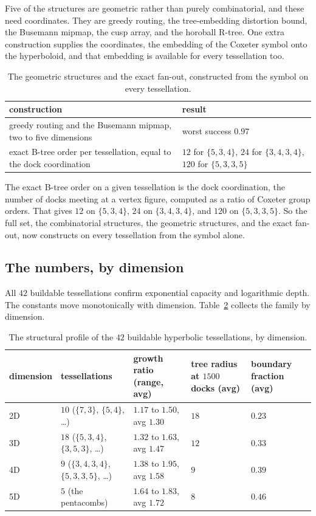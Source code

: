 Five of the structures are geometric rather than purely combinatorial, and these need coordinates. They are greedy routing, the tree-embedding distortion bound, the Busemann mipmap, the cusp array, and the horoball R-tree. One extra construction supplies the coordinates, the embedding of the Coxeter symbol onto the hyperboloid, and that embedding is available for every tessellation too.

\begin{table}[ht]
\centering
\begin{tabular}{@{}ll@{}}
\toprule
construction & result \\
\midrule
greedy routing and the Busemann mipmap, two to five dimensions & worst success $0.97$ \\
exact B-tree order per tessellation, equal to the dock coordination & $12$ for $\{5,3,4\}$, $24$ for $\{3,4,3,4\}$, $120$ for $\{5,3,3,5\}$ \\
\bottomrule
\end{tabular}
\caption{The geometric structures and the exact fan-out, constructed from the symbol on every tessellation.}
\label{tab:geometric-constructions}
\end{table}

The exact B-tree order on a given tessellation is the dock coordination, the number of docks meeting at a vertex figure, computed as a ratio of Coxeter group orders. That gives $12$ on $\{5,3,4\}$, $24$ on $\{3,4,3,4\}$, and $120$ on $\{5,3,3,5\}$. So the full set, the combinatorial structures, the geometric structures, and the exact fan-out, now constructs on every tessellation from the symbol alone.

\subsection{The numbers, by dimension}

All $42$ buildable tessellations confirm exponential capacity and logarithmic depth. The constants move monotonically with dimension. Table~\ref{tab:by-dimension} collects the family by dimension.

\begin{table}[ht]
\centering
\begin{tabular}{@{}lllll@{}}
\toprule
dimension & tessellations & growth ratio (range, avg) & tree radius at $1500$ docks (avg) & boundary fraction (avg) \\
\midrule
2D & $10$ ($\{7,3\}$, $\{5,4\}$, \ldots) & $1.17$ to $1.50$, avg $1.30$ & $18$ & $0.23$ \\
3D & $18$ ($\{5,3,4\}$, $\{3,5,3\}$, \ldots) & $1.32$ to $1.63$, avg $1.47$ & $12$ & $0.33$ \\
4D & $9$ ($\{3,4,3,4\}$, $\{5,3,3,5\}$, \ldots) & $1.38$ to $1.95$, avg $1.58$ & $9$ & $0.39$ \\
5D & $5$ (the pentacombs) & $1.64$ to $1.83$, avg $1.72$ & $8$ & $0.46$ \\
\bottomrule
\end{tabular}
\caption{The structural profile of the $42$ buildable hyperbolic tessellations, by dimension.}
\label{tab:by-dimension}
\end{table}

